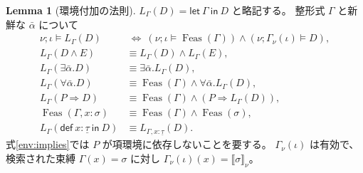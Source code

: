 \documentclass[a4paper,11pt]{article}
\theoremstyle{definition}
\newtheorem{lemma}[definition]{Lemma}
\newcommand{\den}[1]{\llbracket #1\rrbracket}
\newcommand{\Def}[3]{\mathsf{def}\ #1:#2\ \mathsf{in}\ #3}
\newcommand{\mono}[1]{\underline{#1}}
\newcommand{\Feas}{\operatorname{Feas}}
\newcommand{\proofspace}{\Needspace{16\baselineskip}}
\begin{document}
\proofspace
\begin{samepage}
\begin{lemma}[環境付加の法則]\label{lem:env}
$L_\Gamma(D)=\mathsf{let}\ \Gamma\ \mathsf{in}\ D$ と略記する。
整形式 $\Gamma$ と新鮮な $\bar\alpha$ について
\begin{align}
 \nu;\iota\models L_\Gamma(D)
 &\ \Longleftrightarrow\ (\nu;\iota\models\Feas(\Gamma))
          \land(\nu;\Gamma_\nu(\iota)\models D),\label{env:holds}\\
 L_\Gamma(D\land E)&\equiv L_\Gamma(D)\land L_\Gamma(E),\label{env:and}\\
 L_\Gamma(\exists\bar\alpha.D)&\equiv\exists\bar\alpha.L_\Gamma(D),\label{env:exists}\\
 L_\Gamma(\forall\bar\alpha.D)&\equiv\Feas(\Gamma)\land
                  \forall\bar\alpha.L_\Gamma(D),\label{env:forall}\\
 L_\Gamma(P\Rightarrow D)&\equiv\Feas(\Gamma)\land(P\Rightarrow L_\Gamma(D)),\label{env:implies}\\
 \Feas(\Gamma,x:\sigma)&\equiv\Feas(\Gamma)\land\Feas(\sigma),\label{env:push}\\
 L_\Gamma(\Def x{\mono\tau}D)&\equiv L_{\Gamma,x:\mono\tau}(D).\label{env:mono}
\end{align}
式\eqref{env:implies}では $P$ が項環境に依存しないことを要する。
$\Gamma_\nu(\iota)$ は有効で、検索された束縛 $\Gamma(x)=\sigma$ に対し
$\Gamma_\nu(\iota)(x)=\den\sigma_\nu$。
\end{lemma}
\end{samepage}
\nopagebreak[4]
\end{document}
